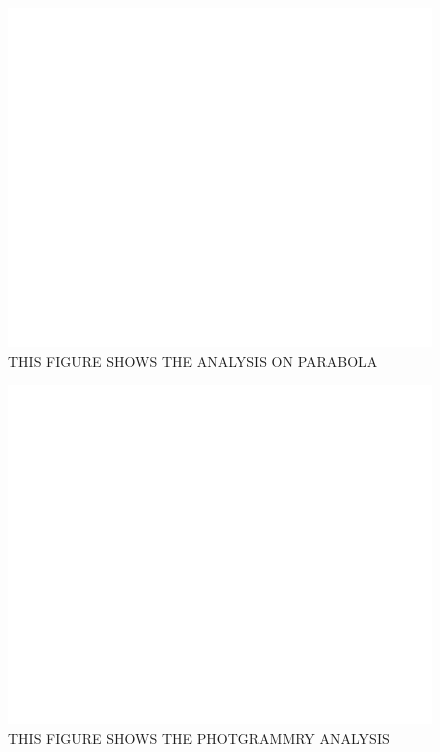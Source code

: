 \documentclass[preprint]{aastex}  %
\begin{document}
\begin{figure}[H]
	\begin{center}
	\includegraphics[width =\textwidth]{empty}
	\caption{THIS FIGURE SHOWS THE ANALYSIS ON PARABOLA
\label{Fig:} }
	\end{center}
\end{figure}

\begin{figure}[H]
	\begin{center}
	\includegraphics[width =\textwidth]{empty}
	\caption{THIS FIGURE SHOWS THE PHOTGRAMMRY ANALYSIS 
\label{Fig:} }
	\end{center}
\end{figure}
\end{document}
